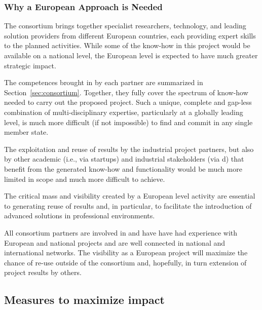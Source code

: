 \subsubsection{Why a European Approach is Needed}
\label{sec:european_approach}
The \Project{} consortium brings together specialist researchers, technology, and leading solution providers from different European countries, each providing expert skills to the planned activities. While some of the know-how in this project would be available on a national level, the European level is expected to have much greater strategic impact.
\begin{denseItemize}
\item The competences brought in by each partner are summarized in Section~\ref{sec:consortium}. Together, they fully cover the spectrum of know-how needed to carry out the proposed project. Such a unique, complete and gap-less combination of multi-disciplinary expertise, particularly at a globally leading level, is much more difficult (if not impossible) to find and commit in any single member state.
\item The exploitation and reuse of results by the industrial project partners, but also by other
  academic (i.e., via startups) and industrial stakeholders (via d) that benefit from the generated know-how and functionality would be much more limited in
  scope and much more difficult to achieve.
\item The critical mass and visibility created by a European level activity are essential to generating reuse of results and, in particular, to facilitate the introduction of advanced solutions in professional environments.
\end{denseItemize}
All consortium partners are involved in and have have had experience with European and national projects and are well connected in national and
international networks. The visibility as a European project will maximize the chance of re-use outside of the consortium and, hopefully, in turn extension of project results by others.


\subsection{Measures to maximize impact}
\label{sec:impact-measures}
